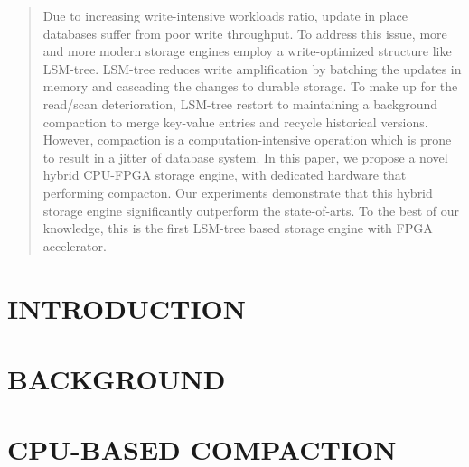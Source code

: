\documentclass{vldb}
\begin{document}


\maketitle

\begin{abstract}
Due to increasing write-intensive workloads ratio, update in place databases suffer from poor write throughput. To address this issue, more and more modern storage engines employ a write-optimized structure like LSM-tree. LSM-tree reduces write amplification by batching the updates in memory and cascading the changes to durable storage. To make up for the read/scan deterioration, LSM-tree restort to maintaining a background compaction to merge key-value entries and recycle historical versions. However, compaction is a computation-intensive operation which is prone to result in a jitter of database system. In this paper, we propose a novel hybrid CPU-FPGA storage engine, with dedicated hardware that performing compacton. Our experiments demonstrate that this hybrid storage engine significantly outperform the state-of-arts. To the best of our knowledge, this is the first LSM-tree based storage engine with FPGA accelerator.
\end{abstract}

\section{INTRODUCTION}

\section{BACKGROUND}

\section{CPU-BASED COMPACTION}
\end{document}
